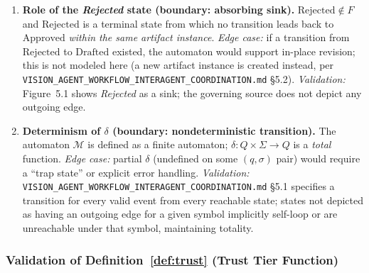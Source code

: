 \documentclass[12pt]{article}
\theoremstyle{definition}
\newcommand{\code}[1]{\texttt{#1}}
\newcommand{\VisionFlow}{\code{VISION\_AGENT\_\allowbreak WORKFLOW\_\allowbreak INTERAGENT\_\allowbreak COORDINATION.md}}
\begin{document}
\begin{enumerate}[label=\textbf{S\arabic*.}, leftmargin=*, widest=S9]
  \item \textbf{Role of the \textit{Rejected} state (boundary:
        absorbing sink).}
        $\mathrm{Rejected} \notin F$ and $\mathrm{Rejected}$ is a
        terminal state from which no transition leads back to
        $\mathrm{Approved}$ \emph{within the same artifact
        instance}.
        \emph{Edge case:} if a transition from $\mathrm{Rejected}$
        to $\mathrm{Drafted}$ existed, the automaton would support
        in-place revision; this is not modeled here (a new artifact
        instance is created instead, per \VisionFlow{} \S5.2).
        \emph{Validation:} Figure~5.1 shows \textit{Rejected} as a
        sink; the governing source does not depict any outgoing edge.

  \item \textbf{Determinism of $\delta$ (boundary: nondeterministic
        transition).}
        The automaton $\mathcal{M}$ is defined as a finite automaton;
        $\delta : Q \times \Sigma \to Q$ is a \emph{total} function.
        \emph{Edge case:} partial $\delta$ (undefined on some
        $(q, \sigma)$ pair) would require a ``trap state'' or
        explicit error handling.
        \emph{Validation:} \VisionFlow{} \S5.1 specifies a transition
        for every valid event from every reachable state; states not
        depicted as having an outgoing edge for a given symbol implicitly
        self-loop or are unreachable under that symbol, maintaining
        totality.

\end{enumerate}

\subsubsection{Validation of Definition~\ref{def:trust}
               (Trust Tier Function)}
\label{sec:val-trust}
\end{document}

